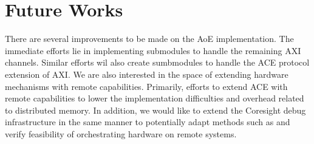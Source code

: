 \chapter{Future Works}
\label{chapter:future_works}

There are several improvements to be made on the AoE implementation. The immediate efforts lie in implementing submodules to handle the remaining AXI channels. Similar efforts wil also create sumbmodules to handle the ACE protocol extension of AXI. We are also interested in the space of extending hardware mechanisms with remote capabilities. Primarily, efforts to extend ACE with remote capabilities to lower the implementation difficulties and overhead related to distributed memory. In addition, we would like to extend the Coresight debug infrastructure in the same manner to potentially adapt methods such as \cite{chenTPA} and verify feasibility of orchestrating hardware on remote systems.